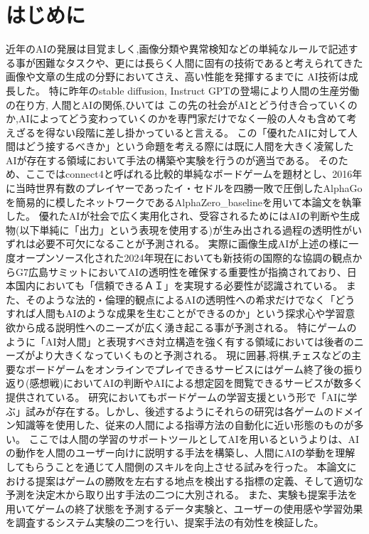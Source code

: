 \chapter{はじめに}
近年のAIの発展は目覚ましく,画像分類や異常検知などの単純なルールで記述する事が困難なタスクや、更には長らく人間に固有の技術であると考えられてきた画像や文章の生成の分野においてさえ、高い性能を発揮するまでに
AI技術は成長した。
特に昨年のstable diffusion\cite{diffusion}, Instruct GPT\cite{GPT}の登場により人間の生産労働の在り方, 人間とAIの関係,ひいては
この先の社会がAIとどう付き合っていくのか,AIによってどう変わっていくのかを専門家だけでなく一般の人々も含めて考えざるを得ない段階に差し掛かっていると言える。
この「優れたAIに対して人間はどう接するべきか」という命題を考える際には既に人間を大きく凌駕したAIが存在する領域において手法の構築や実験を行うのが適当である。
そのため、ここではconnect4と呼ばれる比較的単純なボードゲームを題材とし、2016年に当時世界有数のプレイヤーであったイ・セドルを四勝一敗で圧倒したAlphaGo\cite{ALphaGo}\cite{Nikkei}を簡易的に模したネットワークであるAlphaZero\_baseline\cite{baseline}を用いて本論文を執筆した。
優れたAIが社会で広く実用化され、受容されるためにはAIの判断や生成物(以下単純に「出力」という表現を使用する)が生み出される過程の透明性がいずれは必要不可欠になることが予測される。
実際に画像生成AIが上述の様に一度オープンソース化された2024年現在においても新技術の国際的な協調の観点からG7広島サミットにおいてAIの透明性を確保する重要性が指摘されており\cite{Hiroshima}、日本国内においても「信頼できるＡＩ」を実現する必要性が認識されている\cite{グランドデザイン}。
また、そのような法的・倫理的観点によるAIの透明性への希求だけでなく「どうすれば人間もAIのような成果を生むことができるのか」という探求心や学習意欲から成る説明性へのニーズが広く湧き起こる事が予測される。
特にゲームのように「AI対人間」と表現すべき対立構造を強く有する領域においては後者のニーズがより大きくなっていくものと予測される。
現に囲碁,将棋,チェスなどの主要なボードゲームをオンラインでプレイできるサービスにはゲーム終了後の振り返り(感想戦)においてAIの判断やAIによる想定図を閲覧できるサービスが数多く提供されている。
研究においてもボードゲームの学習支援という形で「AIに学ぶ」試みが存在する。しかし、後述するようにそれらの研究は各ゲームのドメイン知識等を使用した、従来の人間による指導方法の自動化に近い形態のものが多い。
ここでは人間の学習のサポートツールとしてAIを用いるというよりは、AIの動作を人間のユーザー向けに説明する手法を構築し、人間にAIの挙動を理解してもらうことを通じて人間側のスキルを向上させる試みを行った。
本論文における提案はゲームの勝敗を左右する地点を検出する指標の定義、そして適切な予測を決定木から取り出す手法の二つに大別される。
また、実験も提案手法を用いてゲームの終了状態を予測するデータ実験と、ユーザーの使用感や学習効果を調査するシステム実験の二つを行い、提案手法の有効性を検証した。